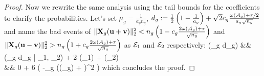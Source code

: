 \begin{proof}
	Now we rewrite the same analysis using the tail bounds for the coefficients to clarify the probabilities. 
	Let's set $\mu_g = \frac{1}{a_g n_g}$, $d_g := \frac{1}{2}\left(1 - \frac{1}{a_g} \right) + \sqrt{2} c_g\frac{\omega({\cal A}_g) + \tau/2}{a_g \sqrt{n_g}}$ and name the bad events of $\|\mathbf{X}_g(\mathbf{u} + \mathbf{v})\|_{2}^2 < n_g \left(1 -  c_g\frac{2 \omega({\cal A}_g) + \tau}{\sqrt{n_g}}\right) $ and $\|\mathbf{X}_g(\mathbf{u} - \mathbf{v})\|_{2}^2 > n_g \left(1 +  c_g\frac{2 \omega({\cal A}_g) + \tau}{\sqrt{n_g}}\right)$ as ${\cal E}_1$ and ${\cal E}_2$ respectively:
	\be 
	\nr 
	\pr(\rho_g \geq d_g) 
	&\leq& \pr(\rho_g \geq d_g | \neg\cE_1, \neg\cE_2) + 2 \pr(\cE_1) + \pr(\cE_2)  
	\\ \nr 
	 &\leq& 0 + 6 \exp\left( -\gamma_g (\omega(\cA_g) + \tau)^2  \right)
	\ee
	which concludes the proof. 	
\end{proof}
		 


